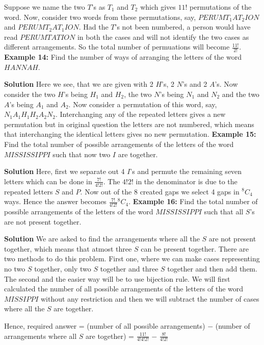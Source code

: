 \documentclass[12pt, a4paper]{article}
\begin{document}
Suppose we name the two $T$'s as $T_1$ and $T_2$ which gives $11!$ permutations of the word. Now, consider two words from these permutations, say, $PERUMT_{1}AT_{2}ION$ and $PERUMT_{2}AT_{1}ION$. Had the $T$'s not been numbered, a person would have read $PERUMTATION$ in both the cases and will not identify the two cases as different arrangements. So the total number of permuations will become $\frac{11!}{2!}$.\newline
\textbf{Example 14:} Find the number of ways of arranging the letters of the word $HANNAH$.

\textbf{Solution} Here we see, that we are given with 2 $H$'s, 2 $N$'s and 2 $A$'s. Now consider the two $H$'s being $H_1$ and $H_2$, the two $N$'s being $N_1$ and $N_2$ and the two $A$'s being $A_1$ and $A_2$. Now consider a permutation of this word, say, $N_{1}A_{1}H_{1}H_{2}A_{2}N_{2}$. Interchanging any of the repeated letters gives a new permutation but in original question the letters are not numbered, which means that interchanging the identical letters gives no new permutation.\newline
\textbf{Example 15:} Find the total number of possible arrangements of the letters of the word $MISSISSIPPI$ such that now two $I$ are together.

\textbf{Solution} Here, first we separate out 4 $I$'s and permute the remaining seven letters which can be done in $\frac{7!}{4!2!}$. The $4!2!$ in the denominator is due to the repeated letters $S$ and $P$. Now out of the 8 created gaps we select 4 gaps in $^8C_4$ ways. Hence the answer becomes $\frac{7!}{4!2!}{^8C_4}$. \newline
\textbf{Example 16:} Find the total number of possible arrangements of the letters of the word $MISSISSIPPI$ such that all $S$'s are not present together.

\textbf{Solution} We are asked to find the arrangements where all the $S$ are not present together, which means that atmost three $S$ can be present together. There are two methods to do this problem. First one, where we can make cases representing no two $S$ together, only two $S$ together and three $S$ together and then add them. The second and the easier way will be to use bijection rule. We will first calculated the number of all possible arrangements of the letters of the word $MISSIPPI$ without any restriction and then we will subtract the number of cases where all the $S$ are together.
\begin{center}
 Hence, required answer = (number of all possible arrangements) $-$ (number of arrangements where all $S$ are together) \newline = $\frac{11!}{4!4!2!}$ $-$ $\frac{8!}{4!2!}$
\end{center}

   
  
\end{document}
